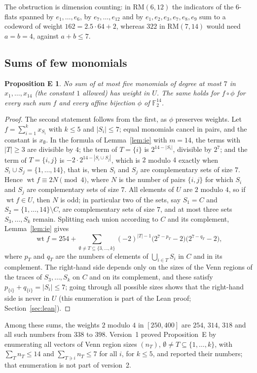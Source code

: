 \documentclass[11pt]{article}
\newtheorem*{propE}{Proposition E}
\theoremstyle{remark}
\newcommand{\F}{\mathbb F}
\newcommand{\RM}{\mathrm{RM}}
\DeclareMathOperator{\wt}{wt}
\begin{document}
The obstruction is dimension counting: in $\RM(6,12)$ the indicators of the
$6$-flats spanned by $e_1,\dots,e_6$, by $e_7,\dots,e_{12}$ and by
$e_1,e_2,e_3,e_7,e_8,e_9$ sum to a codeword of weight $162=2.5\cdot64+2$,
whereas $322$ in $\RM(7,14)$ would need $a=b=4$, against $a+b\le7$.

\subsection{Sums of few monomials}
\begin{propE}
No sum of at most five monomials of degree at most $7$ in $x_1,\dots,x_{14}$
(the constant $1$ allowed) has weight in $U$. The same holds for $f\circ\phi$ for
every such sum $f$ and every affine bijection $\phi$ of $\F_2^{14}$.
\end{propE}
\begin{proof}
The second statement follows from the first, as $\phi$ preserves weights. Let
$f=\sum_{i=1}^kx_{S_i}$ with $k\le5$ and $|S_i|\le7$; equal monomials cancel in
pairs, and the constant is $x_\emptyset$. In the formula of
Lemma~\ref{lem:ie} with $m=14$, the terms with $|T|\ge3$ are divisible by $4$;
the term of $T=\{i\}$ is $2^{14-|S_i|}$, divisible by $2^7$; and the term of
$T=\{i,j\}$ is $-2\cdot2^{14-|S_i\cup S_j|}$, which is $2$ modulo $4$ exactly
when $S_i\cup S_j=\{1,\dots,14\}$, that is, when $S_i$ and $S_j$ are
complementary sets of size $7$. Hence $\wt f\equiv2N\pmod4$, where $N$ is the
number of pairs $\{i,j\}$ for which $S_i$ and $S_j$ are complementary sets of
size $7$. All elements of $U$ are $2$ modulo $4$, so if $\wt f\in U$, then $N$
is odd; in particular two of the sets, say $S_1=C$ and
$S_2=\{1,\dots,14\}\setminus C$, are complementary sets of size $7$, and at
most three sets $S_3,\dots,S_k$ remain. Splitting each union according to $C$
and its complement, Lemma~\ref{lem:ie} gives
\[
\wt f=254+\sum_{\emptyset\ne T\subseteq\{3,\dots,k\}}(-2)^{|T|-1}
\bigl(2^{7-p_T}-2\bigr)\bigl(2^{7-q_T}-2\bigr),
\]
where $p_T$ and $q_T$ are the numbers of elements of $\bigcup_{i\in T}S_i$ in
$C$ and in its complement. The right-hand side depends only on the sizes of the
Venn regions of the traces of $S_3,\dots,S_k$ on $C$ and on its complement,
and these satisfy $p_{\{i\}}+q_{\{i\}}=|S_i|\le7$; going through all possible sizes shows
that the right-hand side is never in $U$ (this enumeration is part of the Lean
proof; Section~\ref{sec:lean}).
\end{proof}

Among these sums, the weights $2$ modulo $4$ in $[250,400]$ are $254$, $314$,
$318$ and all such numbers from $338$ to $398$. Version~1 proved
Proposition~E by enumerating all vectors of Venn region sizes $(n_T)$,
$\emptyset\ne T\subseteq\{1,\dots,k\}$, with $\sum_Tn_T\le14$ and
$\sum_{T\ni i}n_T\le7$ for all $i$, for $k\le5$, and reported their
numbers; that enumeration is not part of version~2.
\end{document}
